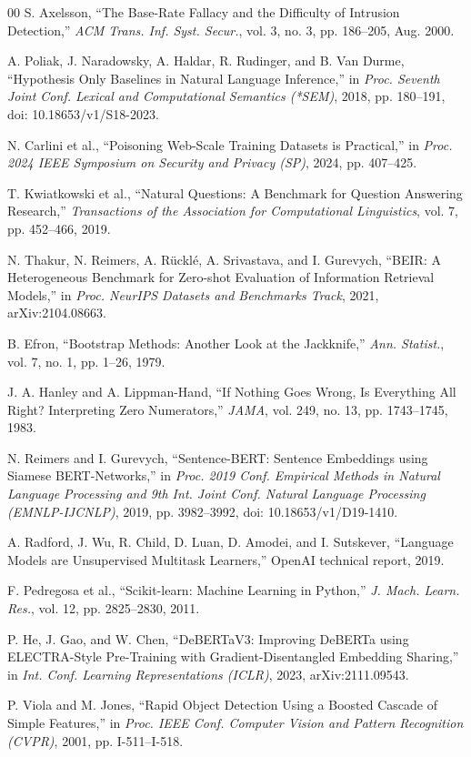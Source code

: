 \begin{thebibliography}{00}
 S. Axelsson, ``The Base-Rate Fallacy and the Difficulty of Intrusion Detection,'' \textit{ACM Trans. Inf. Syst. Secur.}, vol. 3, no. 3, pp. 186--205, Aug. 2000.

 A. Poliak, J. Naradowsky, A. Haldar, R. Rudinger, and B. Van Durme, ``Hypothesis Only Baselines in Natural Language Inference,'' in \textit{Proc. Seventh Joint Conf. Lexical and Computational Semantics (*SEM)}, 2018, pp. 180--191, doi: 10.18653/v1/S18-2023.

 N. Carlini et al., ``Poisoning Web-Scale Training Datasets is Practical,'' in \textit{Proc. 2024 IEEE Symposium on Security and Privacy (SP)}, 2024, pp. 407--425.

 T. Kwiatkowski et al., ``Natural Questions: A Benchmark for Question Answering Research,'' \textit{Transactions of the Association for Computational Linguistics}, vol. 7, pp. 452--466, 2019.

 N. Thakur, N. Reimers, A. R\"{u}ckl\'{e}, A. Srivastava, and I. Gurevych, ``BEIR: A Heterogeneous Benchmark for Zero-shot Evaluation of Information Retrieval Models,'' in \textit{Proc. NeurIPS Datasets and Benchmarks Track}, 2021, arXiv:2104.08663.

 B. Efron, ``Bootstrap Methods: Another Look at the Jackknife,'' \textit{Ann. Statist.}, vol. 7, no. 1, pp. 1--26, 1979.

 J. A. Hanley and A. Lippman-Hand, ``If Nothing Goes Wrong, Is Everything All Right? Interpreting Zero Numerators,'' \textit{JAMA}, vol. 249, no. 13, pp. 1743--1745, 1983.

 N. Reimers and I. Gurevych, ``Sentence-BERT: Sentence Embeddings using Siamese BERT-Networks,'' in \textit{Proc. 2019 Conf. Empirical Methods in Natural Language Processing and 9th Int. Joint Conf. Natural Language Processing (EMNLP-IJCNLP)}, 2019, pp. 3982--3992, doi: 10.18653/v1/D19-1410.

 A. Radford, J. Wu, R. Child, D. Luan, D. Amodei, and I. Sutskever, ``Language Models are Unsupervised Multitask Learners,'' OpenAI technical report, 2019.

 F. Pedregosa et al., ``Scikit-learn: Machine Learning in Python,'' \textit{J. Mach. Learn. Res.}, vol. 12, pp. 2825--2830, 2011.

 P. He, J. Gao, and W. Chen, ``DeBERTaV3: Improving DeBERTa using ELECTRA-Style Pre-Training with Gradient-Disentangled Embedding Sharing,'' in \textit{Int. Conf. Learning Representations (ICLR)}, 2023, arXiv:2111.09543.

 P. Viola and M. Jones, ``Rapid Object Detection Using a Boosted Cascade of Simple Features,'' in \textit{Proc. IEEE Conf. Computer Vision and Pattern Recognition (CVPR)}, 2001, pp. I-511--I-518.

\end{thebibliography}